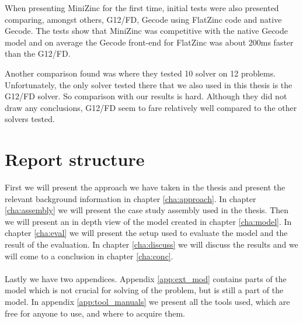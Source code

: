 When presenting MiniZinc for the first time, initial tests were also presented comparing, amongst others, G12/FD, Gecode using FlatZinc code and native Gecode. The tests show that MiniZinc was competitive with the native Gecode model and on average the Gecode front-end for FlatZinc was about 200ms faster than the G12/FD\cite{mz_paper}.

Another comparison found was \cite{nicta_2964} where they tested 10 solver on 12 problems. Unfortunately, the only solver tested there that we also used in this thesis is the G12/FD solver. So comparison with our results is hard. Although they did not draw any conclusions, G12/FD seem to fare relatively well compared to the other solvers tested.


\section{Report structure}
First we will present the approach we have taken in the thesis and present the relevant background information in chapter \ref{cha:approach}. In chapter \ref{cha:assembly} we will present the case study assembly used in the thesis. Then we will present an in depth view of the model created in chapter \ref{cha:model}.  In chapter \ref{cha:eval} we will present the setup used to evaluate the model and the result of the evaluation. In chapter \ref{cha:discuss} we will discuss the results and we will come to a conclusion in chapter \ref{cha:conc}.
\\\\
Lastly we have two appendices. Appendix \ref{app:ext_mod} contains parts of the model which is not crucial for solving of the problem, but is still a part of the model. In appendix \ref{app:tool_manuals} we present all the tools used, which are free for anyone to use, and where to acquire them.
